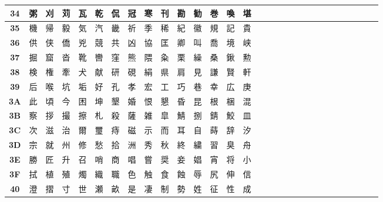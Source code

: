 \begin{table}[H]
\begin{tabular}{|Sc|Sc|Sc|Sc|Sc|Sc|Sc|Sc|Sc|Sc|Sc|Sc|Sc|Sc|Sc|}
\textbf{34} & 粥 & 刈 & 苅 & 瓦 & 乾 & 侃 & 冠 & 寒 & 刊 & 勘 & 勧 & 巻 & 喚 & 堪 \\ \hline
\textbf{35} & 機 & 帰 & 毅 & 気 & 汽 & 畿 & 祈 & 季 & 稀 & 紀 & 徽 & 規 & 記 & 貴 \\ \hline
\textbf{36} & 供 & 侠 & 僑 & 兇 & 競 & 共 & 凶 & 協 & 匡 & 卿 & 叫 & 喬 & 境 & 峡 \\ \hline
\textbf{37} & 掘 & 窟 & 沓 & 靴 & 轡 & 窪 & 熊 & 隈 & 粂 & 栗 & 繰 & 桑 & 鍬 & 勲 \\ \hline
\textbf{38} & 検 & 権 & 牽 & 犬 & 献 & 研 & 硯 & 絹 & 県 & 肩 & 見 & 謙 & 賢 & 軒 \\ \hline
\textbf{39} & 后 & 喉 & 坑 & 垢 & 好 & 孔 & 孝 & 宏 & 工 & 巧 & 巷 & 幸 & 広 & 庚 \\ \hline
\textbf{3A} & 此 & 頃 & 今 & 困 & 坤 & 墾 & 婚 & 恨 & 懇 & 昏 & 昆 & 根 & 梱 & 混 \\ \hline
\textbf{3B} & 察 & 拶 & 撮 & 擦 & 札 & 殺 & 薩 & 雑 & 皐 & 鯖 & 捌 & 錆 & 鮫 & 皿 \\ \hline
\textbf{3C} & 次 & 滋 & 治 & 爾 & 璽 & 痔 & 磁 & 示 & 而 & 耳 & 自 & 蒔 & 辞 & 汐 \\ \hline
\textbf{3D} & 宗 & 就 & 州 & 修 & 愁 & 拾 & 洲 & 秀 & 秋 & 終 & 繍 & 習 & 臭 & 舟 \\ \hline
\textbf{3E} & 勝 & 匠 & 升 & 召 & 哨 & 商 & 唱 & 嘗 & 奨 & 妾 & 娼 & 宵 & 将 & 小 \\ \hline
\textbf{3F} & 拭 & 植 & 殖 & 燭 & 織 & 職 & 色 & 触 & 食 & 蝕 & 辱 & 尻 & 伸 & 信 \\ \hline
\textbf{40} & 澄 & 摺 & 寸 & 世 & 瀬 & 畝 & 是 & 凄 & 制 & 勢 & 姓 & 征 & 性 & 成 \\ \hline
\end{tabular}
\end{table}

